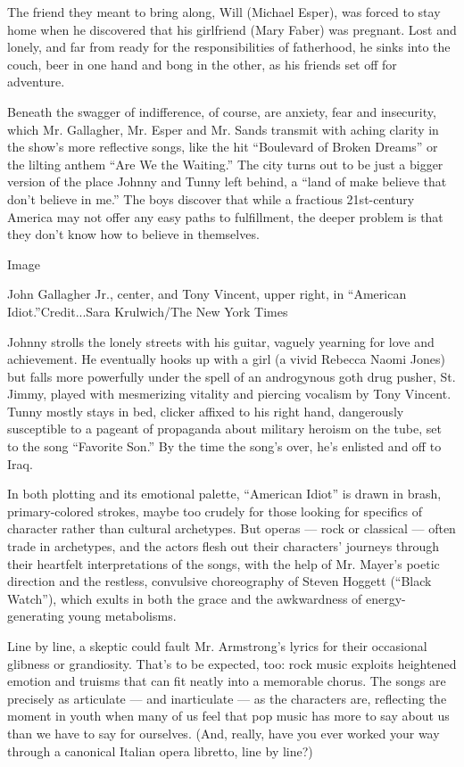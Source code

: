 The friend they meant to bring along, Will (Michael Esper), was forced
to stay home when he discovered that his girlfriend (Mary Faber) was
pregnant. Lost and lonely, and far from ready for the responsibilities
of fatherhood, he sinks into the couch, beer in one hand and bong in the
other, as his friends set off for adventure.

Beneath the swagger of indifference, of course, are anxiety, fear and
insecurity, which Mr. Gallagher, Mr. Esper and Mr. Sands transmit with
aching clarity in the show's more reflective songs, like the hit
``Boulevard of Broken Dreams'' or the lilting anthem ``Are We the
Waiting.'' The city turns out to be just a bigger version of the place
Johnny and Tunny left behind, a ``land of make believe that don't
believe in me.'' The boys discover that while a fractious 21st-century
America may not offer any easy paths to fulfillment, the deeper problem
is that they don't know how to believe in themselves.

Image

John Gallagher Jr., center, and Tony Vincent, upper right, in ``American
Idiot.''Credit...Sara Krulwich/The New York Times

Johnny strolls the lonely streets with his guitar, vaguely yearning for
love and achievement. He eventually hooks up with a girl (a vivid
Rebecca Naomi Jones) but falls more powerfully under the spell of an
androgynous goth drug pusher, St. Jimmy, played with mesmerizing
vitality and piercing vocalism by Tony Vincent. Tunny mostly stays in
bed, clicker affixed to his right hand, dangerously susceptible to a
pageant of propaganda about military heroism on the tube, set to the
song ``Favorite Son.'' By the time the song's over, he's enlisted and
off to Iraq.

In both plotting and its emotional palette, ``American Idiot'' is drawn
in brash, primary-colored strokes, maybe too crudely for those looking
for specifics of character rather than cultural archetypes. But operas
--- rock or classical --- often trade in archetypes, and the actors
flesh out their characters' journeys through their heartfelt
interpretations of the songs, with the help of Mr. Mayer's poetic
direction and the restless, convulsive choreography of Steven Hoggett
(``Black Watch''), which exults in both the grace and the awkwardness of
energy-generating young metabolisms.

Line by line, a skeptic could fault Mr. Armstrong's lyrics for their
occasional glibness or grandiosity. That's to be expected, too: rock
music exploits heightened emotion and truisms that can fit neatly into a
memorable chorus. The songs are precisely as articulate --- and
inarticulate --- as the characters are, reflecting the moment in youth
when many of us feel that pop music has more to say about us than we
have to say for ourselves. (And, really, have you ever worked your way
through a canonical Italian opera libretto, line by line?)

